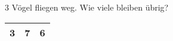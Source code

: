 \documentclass[11pt,a4paper,twoside,german]{article}
\begin{document}
\begin{center}
\end{center}
3 Vögel fliegen weg. Wie viele bleiben übrig?
\hspace{3cm}
\begin{minipage}{6cm}
	\begin{tabular}{*{3}{|C{0.5cm}}|}
		 & 7 & 6\\\hline
	\end{tabular}
\end{minipage}
\end{document}
